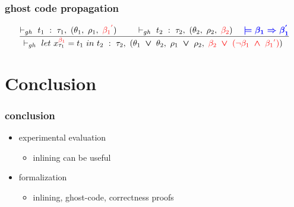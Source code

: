 \documentclass[xcolor=dvipsnames]{beamer}
\newcommand{\rouge}[1]{\textcolor{red}{#1}}
\newcommand{\bwedge}{\boldsymbol{~\wedge~}}
\newcommand{\bvee}{\boldsymbol{~\vee~}}
\newcommand{\gba}[1]{\beta_{#1}}
\newcommand{\gbra}[1]{\textcolor{red}{\gba{#1}}}
\newcommand{\gbran}[1]{\textcolor{red}{\neg\gba{#1}}}
\newcommand{\ghosttyping}[6]{\vdash_{gh}~#1~:~#2,~(#3,~#4,~\rouge{#5})~\textcolor{blue}{\boldsymbol{#6}}}
\begin{document}
\begin{frame}
\frametitle{ghost code propagation}
\begin{footnotesize}	
\begin{displaymath}
\begin{array}{l}
\dfrac
	{
		\ghosttyping
			{t_1}
			{\tau_1}
			{\theta_1}
			{\rho_1}
			{\gbra{1}^{\rouge{'}}}
			{} \qquad
		\ghosttyping
			{t_2}
			{\tau_2}
			{\theta_2}
			{\rho_2}
			{\gbra{2}}
			{  \quad \models \gba{1} \Rightarrow \gba{1}^{'}}
	}
	{\ghosttyping
		{let~x^{\gbra{1}}_{\tau_1} = t_1~in~t_2}
		{\tau_2}
		{\theta_1 \bvee \theta_2}
		{\rho_1 \bvee \rho_2}
		{\gbra{2} \bvee (\gbran{1} \bwedge \gbra{1}^{\rouge{'}})}
		{}}
	{}
	\end{array}	
\end{displaymath}
\end{footnotesize}	
\end{frame}

\section*{Conclusion}
\begin{frame}
\frametitle{conclusion}
\begin{itemize}
\item experimental evaluation 
\begin{itemize}
	\item inlining can be useful 
\end{itemize}
\item formalization
\begin{itemize}
	\item inlining, ghost-code, correctness proofs
\end{itemize}
\end{itemize}
\end{frame}
%	

	

\end{document}
